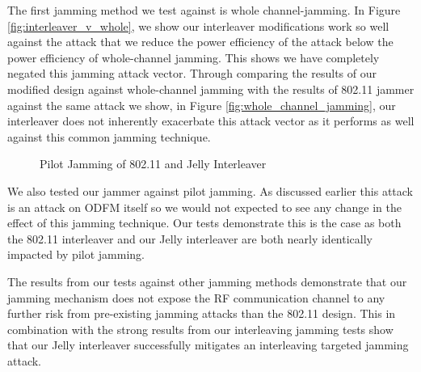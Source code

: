 \documentclass[sigconf]{acmart}
\begin{document}
The first jamming method we test against is whole channel-jamming. In Figure \ref{fig:interleaver_v_whole}, we show our interleaver modifications work so well against the attack that we reduce the power efficiency of the attack below the power efficiency of whole-channel jamming. This shows we have completely negated this jamming attack vector. Through comparing the results of our modified design against whole-channel jamming with the results of 802.11 jammer against the same attack we show, in Figure \ref{fig:whole_channel_jamming}, our interleaver does not inherently exacerbate this attack vector as it performs as well against this common jamming technique. 

\begin{figure}[h]
    \centering
    
    
    \caption{Pilot Jamming of 802.11 and Jelly Interleaver}
    \label{fig:pilot_jamming}
\end{figure}

We also tested our jammer against pilot jamming. As discussed earlier this attack is an attack on ODFM itself so we would not expected to see any change in the effect of this jamming technique. Our tests demonstrate this is the case as both the 802.11 interleaver and our Jelly interleaver are both nearly identically impacted by pilot jamming. 

The results from our tests against other jamming methods demonstrate that our jamming mechanism does not expose the RF communication channel to any further risk from pre-existing jamming attacks than the 802.11 design. This in combination with the strong results from our interleaving jamming tests show that our Jelly interleaver successfully mitigates an interleaving targeted jamming attack.
\end{document}
